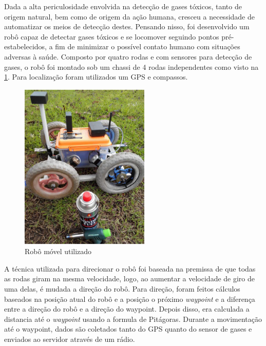 Dada a alta periculosidade envolvida na detecção de gases tóxicos, tanto de origem natural, bem como de origem da ação humana, cresceu a necessidade de automatizar os meios de detecção destes. Pensando nisso, foi desenvolvido um robô capaz de detectar gases tóxicos e se locomover seguindo pontos pré-estabelecidos, a fim de minimizar o possível contato humano com situações adversas à saúde.  Composto por quatro rodas e com sensores para detecção de gases, o robô foi montado sob um chassi de 4 rodas independentes como visto na \ref{fig:gas:chassi}. Para localização foram utilizados um GPS e compassos.
\begin{figure}[H]
    \centering
    \includegraphics[width=0.55\textwidth]{figuras/chassi_robo_gas.png}
    \caption{Robô móvel utilizado}
    \label{fig:gas:chassi}
\end{figure}
A técnica utilizada para direcionar o robô foi baseada na premissa de que todas as rodas giram na mesma velocidade, logo, ao aumentar a velocidade de giro de uma delas, é mudada a direção do robô. Para direção, foram feitos cálculos baseados na posição atual do robô e a posição o próximo \textit{waypoint} e a diferença entre a direção do robô e a direção do waypoint. Depois disso, era calculada a distancia até o \textit{waypoint} usando a formula de Pitágoras. Durante a movimentação até o waypoint, dados são coletados tanto do GPS quanto do sensor de gases e enviados ao servidor através de um rádio.

